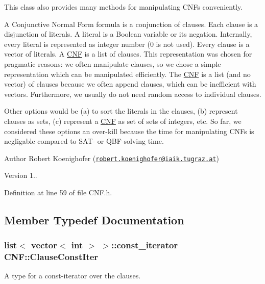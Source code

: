 This class also provides many methods for manipulating C\-N\-Fs conveniently.

A Conjunctive Normal Form formula is a conjunction of clauses. Each clause is a disjunction of literals. A literal is a Boolean variable or its negation. Internally, every literal is represented as integer number (0 is not used). Every clause is a vector of literals. A \hyperlink{classCNF}{C\-N\-F} is a list of clauses. This representation was chosen for pragmatic reasons\-: we often manipulate clauses, so we chose a simple representation which can be manipulated efficiently. The \hyperlink{classCNF}{C\-N\-F} is a list (and no vector) of clauses because we often append clauses, which can be inefficient with vectors. Furthermore, we usually do not need random access to individual clauses.

Other options would be (a) to sort the literals in the clauses, (b) represent clauses as sets, (c) represent a \hyperlink{classCNF}{C\-N\-F} as set of sets of integers, etc. So far, we considered these options an over-\/kill because the time for manipulating C\-N\-Fs is negligable compared to S\-A\-T-\/ or Q\-B\-F-\/solving time.

\begin{DoxyAuthor}{Author}
Robert Koenighofer (\href{mailto:robert.koenighofer@iaik.tugraz.at}{\tt robert.\-koenighofer@iaik.\-tugraz.\-at}) 
\end{DoxyAuthor}
\begin{DoxyVersion}{Version}
1.. 
\end{DoxyVersion}


Definition at line 59 of file C\-N\-F.\-h.



\subsection{Member Typedef Documentation}
\hypertarget{classCNF_a0d29737450f8bbc9f8549235577881ec}{
\subsubsection[{Clause\-Const\-Iter}]{\setlength{\rightskip}{0pt plus 5cm}list$<$ vector$<$ int $>$ $>$\-::const\-\_\-iterator {\bf C\-N\-F\-::\-Clause\-Const\-Iter}}}\label{classCNF_a0d29737450f8bbc9f8549235577881ec}


A type for a const-\/iterator over the clauses. 



